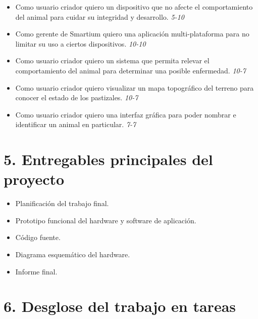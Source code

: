 \documentclass[11pt]{charter}
\begin{document}
\begin{itemize}
\item Como usuario criador quiero un dispositivo que no afecte el comportamiento del animal para cuidar su integridad y desarrollo. \textit{5-10}
\item Como gerente de Smartium quiero una aplicación multi-plataforma para no limitar su uso a ciertos dispositivos. \textit{10-10}
\item Como usuario criador quiero un sistema que permita relevar el comportamiento del animal para determinar una posible enfermedad. \textit{10-7}
\item Como usuario criador quiero visualizar un mapa topográfico del terreno para conocer el estado de los pastizales. \textit{10-7}
\item Como usuario criador quiero una interfaz gráfica para poder nombrar e identificar un animal en particular. \textit{7-7}   
\end{itemize}

\section{5. Entregables principales del proyecto}
\label{sec:entregables}


\begin{itemize}
\item Planificación del trabajo final.
\item Prototipo funcional del hardware y software de aplicación.
\item Código fuente.
\item Diagrama esquemático del hardware.
\item Informe final.

\end{itemize}

\section{6. Desglose del trabajo en tareas}
\label{sec:wbs}
\end{document}

